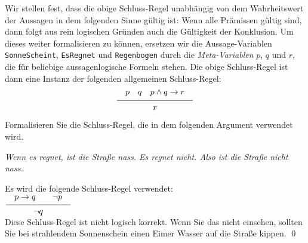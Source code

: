  Wir stellen fest, dass die obige Schluss-Regel unabh\"{a}ngig von dem Wahrheitswert der Aussagen in dem folgenden Sinne
g\"{u}ltig ist: Wenn alle Pr\"{a}missen g\"{u}ltig sind, dann folgt aus rein logischen Gr\"{u}nden auch die G\"{u}ltigkeit der Konklusion. 
 Um dieses weiter formalisieren zu k\"{o}nnen, ersetzen wir die Aussage-Variablen
 \texttt{SonneScheint}, \texttt{EsRegnet} und \texttt{Regenbogen} durch die
 \emph{\color{blue}Meta-Variablen} $p$, $q$ und $r$, die f\"{u}r beliebige aussagenlogische Formeln stehen.
  Die obige Schluss-Regel ist dann eine Instanz der folgenden allgemeinen Schluss-Regel:
$$ \schluss{p \quad q \quad p \wedge q \rightarrow r}{r}  $$

\exercise
Formalisieren Sie die Schluss-Regel, die in dem folgenden Argument verwendet wird.
\begin{center}
\begin{minipage}[c]{7.9cm}
\textsl{Wenn es regnet, ist die Stra\ss{}e nass.  Es regnet nicht.  Also ist die Stra\ss{}e nicht nass. \eox} 
\end{minipage}  
\end{center}

\solution
Es wird die folgende Schluss-Regel verwendet: \\[0.2cm]
\hspace*{1.3cm} $\schluss{p \rightarrow q \quad\quad \neg p}{\neg q}$\\[0.2cm]
Diese Schluss-Regel ist nicht logisch korrekt.  Wenn Sie das nicht einsehen, sollten Sie bei
strahlendem Sonnenschein einen Eimer Wasser auf die Stra\ss{}e kippen.  \qed
\vspace*{0.1cm}

